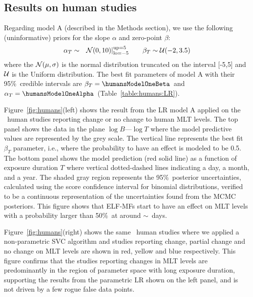 \documentclass[a4]{article}
\begin{document}
 
 
\subsection*{Results on human studies} 
\label{section:results:human}

Regarding model A (described in the Methods section), we use   the following (uninformative) priors for the slope $\alpha$ and zero-point $\beta$:
\begin{eqnarray}
\alpha_T&\sim& {\cal N}(0,10)|_{\rm lo=-5}^{\rm up=5}\qquad
\beta_T\sim{\cal U}(-2,3.5)\label{eq:priors:linearT}
\end{eqnarray}
where  the ${\cal N}(\mu,\sigma)$ is the normal distribution truncated on the interval [-5,5] and ${\cal U}$ is the Uniform distribution.
The best fit parameters of model A with their 95\%\ credible intervals are  $\beta_T=\humansModelOneBeta$\humansModelOneBetaErr\  and  $\alpha_T=\humansModelOneAlpha$\humansModelOneAlphaErr\ (Table~\ref{table:humans:LR}).

Figure~\ref{fig:humans}(left) shows the result from the LR model A applied on the \Nhums\ human studies reporting change or no change to human MLT levels. The top panel shows the data in the plane $\log B$---$\log T$ where the model predictive values are represented by the grey scale. The vertical line represents the best fit $\beta_T$ parameter, i.e., where the probability to have an effect is modeled to be 0.5.
The bottom panel shows the model prediction (red solid line) as a function of  exposure duration $T$   where vertical dotted-dashed lines indicating a day, a month, and a year.  The shaded gray region represents the 95\%\ posterior uncertainties, calculated using the \citet{Wilson1927} score confidence interval  for binomial distributions, verified to be a continuous representation of the uncertainties found from the MCMC posteriors.  
This figure shows that ELF-MFs start to have  an effect on MLT levels  with a probability larger than 50\%\ at around $\sim$\humansModelOneBetaDays~days. 

Figure~\ref{fig:humans}(right) shows the same  \Nhums\ human studies  where we applied a  non-parametric SVC algorithm  and studies reporting change, partial change and no change on MLT levels are shown in red, yellow and blue respectively.
This figure confirms that the studies reporting changes in MLT levels are predominantly in the region of parameter space with long exposure duration, supporting the results from the parametric LR shown on the left panel, and is not driven by a few rogue false data points. 
\end{document}
